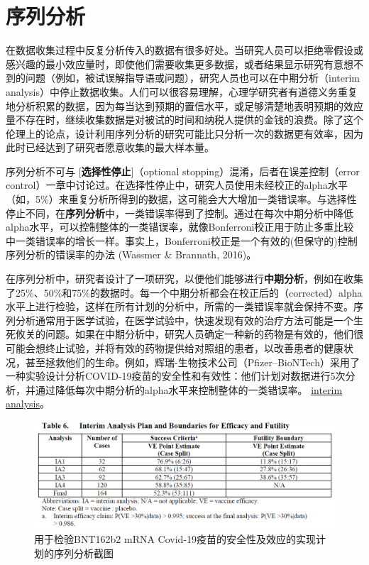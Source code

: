 \documentclass[
  letterpaper,
  DIV=11,
  numbers=noendperiod]{scrreprt}
\begin{document}

\hypertarget{sec-sequential}{%
\chapter{序列分析}\label{sec-sequential}}

在数据收集过程中反复分析传入的数据有很多好处。当研究人员可以拒绝零假设或感兴趣的最小效应量时，即使他们需要收集更多数据，或者结果显示研究有意想不到的问题（例如，被试误解指导语或问题），研究人员也可以在中期分析（interim
analysis）中停止数据收集。人们可以很容易理解，心理学研究者有道德义务重复地分析积累的数据，因为每当达到预期的置信水平，或足够清楚地表明预期的效应量不存在时，继续收集数据是对被试的时间和纳税人提供的金钱的浪费。除了这个伦理上的论点，设计利用序列分析的研究可能比只分析一次的数据更有效率，因为此时已经达到了研究者愿意收集的最大样本量。

序列分析不可与 {[}\textbf{选择性停止}{]}（optional
stopping）混淆，后者在误差控制（error
control）一章中讨论过。在选择性停止中，研究人员使用未经校正的alpha水平（如，5\%）来重复分析所得到的数据，这可能会大大增加一类错误率。与选择性停止不同，在\textbf{序列分析}中，一类错误率得到了控制。通过在每次中期分析中降低alpha水平，可以控制整体的一类错误率，就像Bonferroni校正用于防止多重比较中一类错误率的增长一样。事实上，Bonferroni校正是一个有效的(但保守的)控制序列分析的错误率的办法
(Wassmer \& Brannath, 2016)。

在序列分析中，研究者设计了一项研究，以便他们能够进行\textbf{中期分析}，例如在收集了25\%、50\%和75\%的数据时。每一个中期分析都会在校正后的（corrected）alpha水平上进行检验，这样在所有计划的分析中，所需的一类错误率就会保持不变。序列分析通常用于医学试验，在医学试验中，快速发现有效的治疗方法可能是一个生死攸关的问题。如果在中期分析中，研究人员确定一种新的药物是有效的，他们很可能会想终止试验，并将有效的药物提供给对照组的患者，以改善患者的健康状况，甚至拯救他们的生命。例如，辉瑞-生物技术公司（Pfizer--BioNTech）采用了一种实验设计分析COVID-19疫苗的安全性和有效性：他们计划对数据进行5次分析，并通过降低每次中期分析的alpha水平来控制整体的一类错误率。
\href{https://www.nejm.org/doi/suppl/10.1056/NEJMoa2034577/suppl_file/nejmoa2034577_protocol.pdf}{interim
analysis}。

\begin{figure}

{\centering \includegraphics[width=1\textwidth,height=\textheight]{images/vaccinetrial.png}

}

\caption{用于检验BNT162b2 mRNA
Covid-19疫苗的安全性及效应的实现计划的序列分析截图}

\end{figure}
\end{document}

